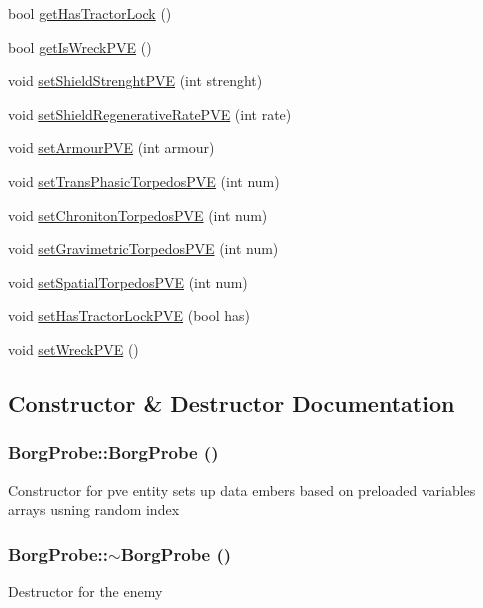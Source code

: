 \begin{DoxyCompactItemize}
\item 
bool \hyperlink{classBorgProbe_a3e0cfde0db3e63c1405afe14699b3122}{getHasTractorLock} ()
\item 
bool \hyperlink{classBorgProbe_ab3a53f7518386129055fa678d75f99a5}{getIsWreckPVE} ()
\item 
void \hyperlink{classBorgProbe_a1866290e2fb1a65e12d4448bcba5d932}{setShieldStrenghtPVE} (int strenght)
\item 
void \hyperlink{classBorgProbe_a6cdeb57ba40d96381f4178d01e3d4cae}{setShieldRegenerativeRatePVE} (int rate)
\item 
void \hyperlink{classBorgProbe_aa823f6c8ba0b31727124e104f2e9956b}{setArmourPVE} (int armour)
\item 
void \hyperlink{classBorgProbe_ade7cc51b7c80a763a1f6c28e0770266e}{setTransPhasicTorpedosPVE} (int num)
\item 
void \hyperlink{classBorgProbe_a8c289005635315de539283a12f96d03e}{setChronitonTorpedosPVE} (int num)
\item 
void \hyperlink{classBorgProbe_a992e10da14904a7ab14bc34ac9ec63ee}{setGravimetricTorpedosPVE} (int num)
\item 
void \hyperlink{classBorgProbe_a69c828eb05d8d652d66b57e12caa96fd}{setSpatialTorpedosPVE} (int num)
\item 
void \hyperlink{classBorgProbe_ab38152299b9d34950bf4acd740544328}{setHasTractorLockPVE} (bool has)
\item 
void \hyperlink{classBorgProbe_a6b4c0d1bdfc717349fd1e74ac710a7da}{setWreckPVE} ()
\end{DoxyCompactItemize}


\subsection{Constructor \& Destructor Documentation}
\hypertarget{classBorgProbe_a3af24a2d8ca19a3770f15a1c873709cb}{
\subsubsection[{BorgProbe}]{\setlength{\rightskip}{0pt plus 5cm}BorgProbe::BorgProbe ()}}
\label{db/deb/classBorgProbe_a3af24a2d8ca19a3770f15a1c873709cb}
Constructor for pve entity sets up data embers based on preloaded variables arrays usning random index \hypertarget{classBorgProbe_a4d58be5de785e9816f5c9bbda8625951}{
\subsubsection[{$\sim$BorgProbe}]{\setlength{\rightskip}{0pt plus 5cm}BorgProbe::$\sim$BorgProbe ()}}
\label{db/deb/classBorgProbe_a4d58be5de785e9816f5c9bbda8625951}
Destructor for the enemy 

